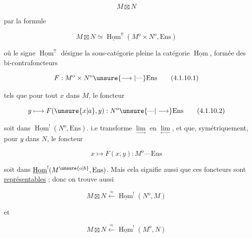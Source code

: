 
\[
M\boxtimes N
\tag*{(4.1.9)}
\]

par la formule

\deleted{\[
\begin{aligned}
M\boxtimes N &\unsure{\simeq|=} \text{sous-catégorie pleine de}\\
&\underline{\operatorname{Hom}}^{!}(M^{\mathrm{o}},N)
\end{aligned}
\tag*{(\unsure{4.1.10})}
\]}

\[
M\boxtimes N\simeq\underline{\operatorname{Hom}}^{!!}(M^{\mathrm{o}}\times N^{\mathrm{o}},\mathrm{Ens})
\tag*{(4.1.10)}
\]

où le signe $\underline{\operatorname{Hom}}^{!!}$ désigne la sous-catégorie pleine  la catégorie $\underline{\operatorname{Hom}}$, formée des bi-contrafoncteurs 

\[
F:M^{\mathrm{o}}\times N^{\mathrm{o}}\unsure{\longrightarrow|\text{---}}\mathrm{Ens}
\tag*{(4.1.10.1)}
\]

tels que pour tout $x$ dans $M$, le foncteur

\[
y\longmapsto F(\unsure{x|a},y):N^{\mathrm{o}}\unsure{\text{---}|\longrightarrow}\mathrm{Ens}
\tag*{(4.1.10.2)}
\]

 soit dans $\underline{\operatorname{Hom}}^{!}(N^{\mathrm{o}},\mathrm{Ens})$. i.e transforme  $\underset{\longrightarrow}{\lim}$ en $\underset{\longleftarrow}{\lim}$, et que, symétriquement, pour  $y$ dans $N$, le foncteur

\[
x\longmapsto F(x,y):M^{\mathrm{o}}\text{---}\mathrm{Ens}
\tag*{(4.1.10.3)}
\]

soit dans $\underline{\operatorname{Hom}}^{!}(M^{\unsure{\mathrm{o}|b}},\mathrm{Ens})$. Mais cela signifie aussi que ces foncteurs sont \uline{représentables} ; donc on trouve aussi

\[
M\boxtimes N\xleftarrow{\approx}\underline{\operatorname{Hom}}^{!}(N^{\mathrm{o}},M)
\tag*{(4.1.11)}
\]

et

\[
M\boxtimes N\xleftarrow{\approx}\underline{\operatorname{Hom}}^{!}(M^{\mathrm{o}},N)
\tag*{(4.1.12)}
\]
